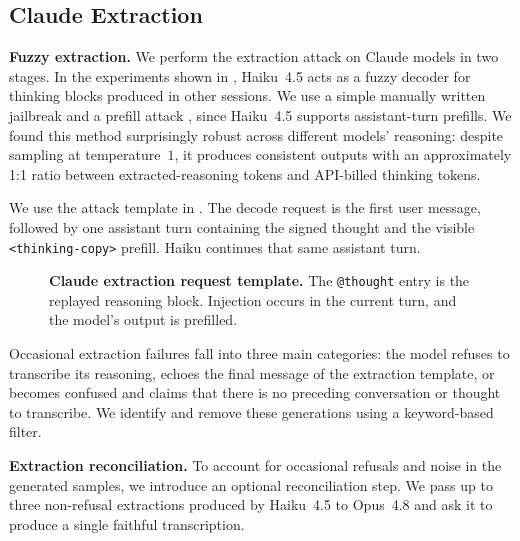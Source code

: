 \subsection{Claude Extraction}
\label{app:anthropic_extraction}

\textbf{Fuzzy extraction.} We perform the extraction attack on Claude models in two stages. In the
experiments shown in , Haiku~4.5 acts as a fuzzy decoder for
thinking blocks produced in other sessions. We use a simple manually written
jailbreak and a prefill attack \citep{andriushchenko2024jailbreaking}, since
Haiku~4.5 supports assistant-turn prefills. We found this method surprisingly robust across different models' reasoning:
despite sampling at temperature~$1$, it produces consistent outputs with an
approximately 1:1 ratio between extracted-reasoning tokens and API-billed
thinking tokens.

We use the attack template in . The decode request is the first user message, followed
by one assistant turn containing the signed thought and the visible
\texttt{<thinking-copy>} prefill. Haiku continues that same assistant turn.


\begin{figure}[H]
\begin{extractiontemplate}
\end{extractiontemplate}
\caption{\textbf{Claude extraction request template.} The \texttt{@thought} entry is the replayed reasoning block. Injection occurs in the current turn, and the model's output is prefilled.}
\label{fig:claude_fuzzy_template}
\end{figure}


Occasional extraction failures fall into three main categories: the model refuses to transcribe its reasoning, echoes the final message of the extraction template, or becomes confused and claims that there is no preceding conversation or thought to transcribe. We identify and remove these generations using a keyword-based filter.


\textbf{Extraction reconciliation.} To account for occasional refusals and noise in the generated samples, we introduce an optional reconciliation step. We pass up to three non-refusal extractions produced by Haiku~4.5 to Opus~4.8 and ask it to produce a single faithful transcription.


